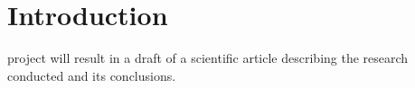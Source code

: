 %
\IEEEpeerreviewmaketitle



\section{Introduction}
% 
% 
% 
% 
 project will result in a draft of a scientific article describing the research conducted and its conclusions.


%
%

